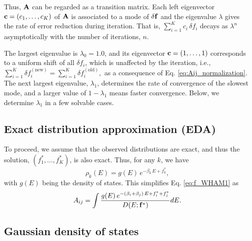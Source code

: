 \documentclass[aip,jcp,preprint,superscriptaddress]{revtex4-1}
\begin{document}
Thus,
$\mathbf{A}$
can be regarded as a transition matrix\cite{
newman}.
%
Each left eigenvector
$\mathbf{c} = (c_1, \dots, c_K)$
of $\mathbf{A}$
is associated to a mode of $\delta \mathbf{f}$
and the eigenvalue $\lambda$
gives the rate of error reduction
during iteration.
%
That is,
$\sum_{i = 1}^K c_i \, \delta f_i$
decays as $\lambda^n$
asymptotically
with the number of iterations, $n$.




The largest eigenvalue is $\lambda_0 = 1.0$,
and its eigenvector
$\mathbf{c} = (1, \dots, 1)$
corresponds to a uniform shift of all
$\delta f_i$,
which is unaffected by the iteration,
%
i.e.,
$
\sum_{i=1}^K \delta f_i^\mathrm{(new)}
=
\sum_{i=1}^K \delta f_i^\mathrm{(old)},
$
as a consequence of
Eq. \eqref{eq:Aij_normalization}.
%
The next largest eigenvalue,
$\lambda_1$,
determines the rate of convergence
of the slowest mode,
%
and a larger value of
$1 - \lambda_1$
means faster convergence.
%
Below,
we determine $\lambda_1$
in a few solvable cases.



\subsection{Exact distribution approximation (EDA)}



To proceed, we assume that
the observed distributions are exact,
%
and thus the solution,
$(f_1^*, \dots, f_K^*)$,
is also exact.
%
Thus, for any $k$, we have
%
\begin{equation}
\rho_k(E)
=
g(E) \,
e^{-\beta_k \, E + f_k^*},
\label{eq:rho_EDA}
\end{equation}
%
with $g(E)$ being the density of states.
%
%
This simplifies Eq. \eqref{eq:f_WHAM1} as
%
\begin{align}
A_{ij}
=
\int
\frac
{
  g(E) \, e^{ -(\beta_i + \beta_j) \, E + f_i^* + f_j^*}
}
{
  D(E; \mathbf{f}^*)
}
dE.
\label{eq:Aij_EDA}
\end{align}




\subsection{Gaussian density of states}
\end{document}
